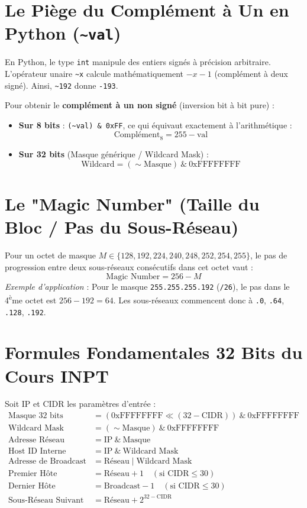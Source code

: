 \documentclass[11pt,a4paper]{report}
\begin{document}
\section{Le Pi\`ege du Compl\'ement \`a Un en Python (\texttt{\textasciitilde val})}
En Python, le type \texttt{int} manipule des entiers sign\'es \`a pr\'ecision arbitraire. L'op\'erateur unaire \texttt{\textasciitilde x} calcule math\'ematiquement $-x - 1$ (compl\'ement \`a deux sign\'e). Ainsi, \texttt{\textasciitilde 192} donne \texttt{-193}.

Pour obtenir le \textbf{compl\'ement \`a un non sign\'e} (inversion bit \`a bit pure) :
\begin{itemize}
    \item \textbf{Sur 8 bits} : \texttt{(\textasciitilde val) \& 0xFF}, ce qui \'equivaut exactement \`a l'arithm\'etique :
    $$\text{Compl\'ement}_8 = 255 - \text{val}$$
    \item \textbf{Sur 32 bits} (Masque g\'en\'erique / Wildcard Mask) :
    $$\text{Wildcard} = (\sim\text{Masque}) \ \& \ \text{0xFFFFFFFF}$$
\end{itemize}

\section{Le "Magic Number" (Taille du Bloc / Pas du Sous-R\'eseau)}
Pour un octet de masque $M \in \{128, 192, 224, 240, 248, 252, 254, 255\}$, le pas de progression entre deux sous-r\'eseaux cons\'ecutifs dans cet octet vaut :
$$\text{Magic Number} = 256 - M$$
\textit{Exemple d'application} : Pour le masque \texttt{255.255.255.192} (\texttt{/26}), le pas dans le 4\textsuperscript{\`e}me octet est $256 - 192 = 64$. Les sous-r\'eseaux commencent donc \`a \texttt{.0}, \texttt{.64}, \texttt{.128}, \texttt{.192}.

\section{Formules Fondamentales 32 Bits du Cours INPT}
Soit $\text{IP}$ et $\text{CIDR}$ les param\`etres d'entr\'ee :
\begin{align*}
    \text{Masque 32 bits} &= (\text{0xFFFFFFFF} \ll (32 - \text{CIDR})) \ \& \ \text{0xFFFFFFFF} \\
    \text{Wildcard Mask} &= (\sim\text{Masque}) \ \& \ \text{0xFFFFFFFF} \\
    \text{Adresse R\'eseau} &= \text{IP} \ \& \ \text{Masque} \\
    \text{Host ID Interne} &= \text{IP} \ \& \ \text{Wildcard Mask} \\
    \text{Adresse de Broadcast} &= \text{R\'eseau} \mid \text{Wildcard Mask} \\
    \text{Premier H\^ote} &= \text{R\'eseau} + 1 \quad (\text{si } \text{CIDR} \le 30) \\
    \text{Dernier H\^ote} &= \text{Broadcast} - 1 \quad (\text{si } \text{CIDR} \le 30) \\
    \text{Sous-R\'eseau Suivant} &= \text{R\'eseau} + 2^{32 - \text{CIDR}}
\end{align*}
\end{document}
